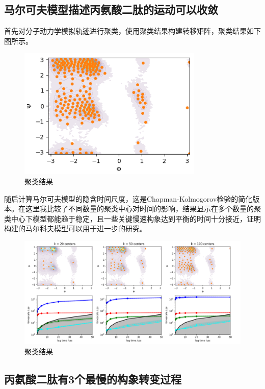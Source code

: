 \documentclass[a4paper]{article}
\begin{document}
\begin{CJK}{UTF8}{gbsn}
	

	\subsection{马尔可夫模型描述丙氨酸二肽的运动可以收敛}

	首先对分子动力学模拟轨迹进行聚类，使用聚类结果构建转移矩阵，聚类结果如下图所示。
\begin{figure}[H]
\centering
\includegraphics[scale=0.75]{clus.png}
\caption{聚类结果}
\end{figure}

	随后计算马尔可夫模型的隐含时间尺度，这是Chapman-Kolmogorov检验的简化版本。在这里我比较了不同数量的聚类中心对时间的影响，结果显示在多个数量的聚类中心下模型都能趋于稳定，且一些关键慢速构象达到平衡的时间十分接近，证明构建的马尔科夫模型可以用于进一步的研究。


\begin{figure}[H]
\centering
\includegraphics[scale=0.55]{impied.png}
\caption{聚类结果}
\end{figure}


	\subsection{丙氨酸二肽有3个最慢的构象转变过程}
	

\end{CJK}
\end{document}
